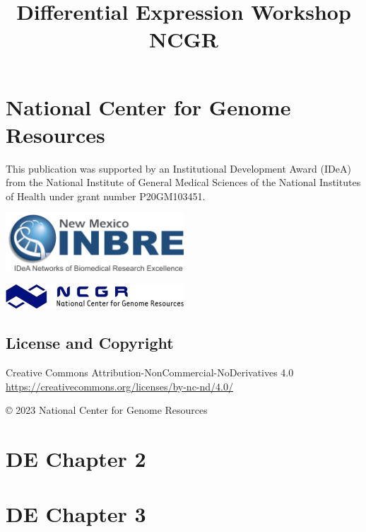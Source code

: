 \documentclass[
]{book}
\title{Differential Expression Workshop NCGR}
\author{}
\date{\vspace{-2.5em}}
\begin{document}
\maketitle

{
\setcounter{tocdepth}{1}
\tableofcontents
}
\hypertarget{national-center-for-genome-resources}{%
\chapter*{National Center for Genome Resources}\label{national-center-for-genome-resources}}

This publication was supported by an Institutional Development Award (IDeA) from the National Institute of General Medical Sciences of the National Institutes of Health under grant number P20GM103451.

\includegraphics[width=0.5\textwidth,height=\textheight]{./Figures/INBRE_Logo_Grad_transparent-2019.png}

\includegraphics[width=0.5\textwidth,height=\textheight]{./Figures/ncgr.png}

\hypertarget{license-and-copyright}{%
\section*{License and Copyright}\label{license-and-copyright}}

Creative Commons Attribution-NonCommercial-NoDerivatives 4.0
\url{https://creativecommons.org/licenses/by-nc-nd/4.0/}

© 2023 National Center for Genome Resources

\hypertarget{de-chapter-2}{%
\chapter{DE Chapter 2}\label{de-chapter-2}}

\hypertarget{de-chapter-3}{%
\chapter{DE Chapter 3}\label{de-chapter-3}}
\end{document}
